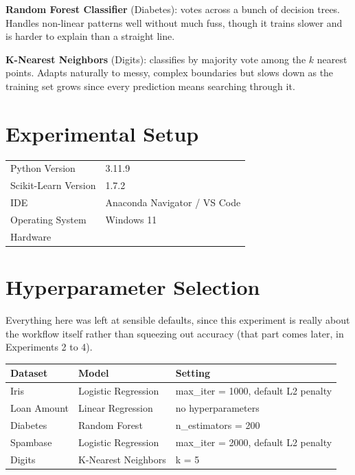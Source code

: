 \documentclass[12pt,a4paper]{article}
\begin{document}
\textbf{Random Forest Classifier} (Diabetes): votes across a bunch of decision trees. Handles
non-linear patterns well without much fuss, though it trains slower and is harder to explain than a
straight line.

\textbf{K-Nearest Neighbors} (Digits): classifies by majority vote among the $k$ nearest points. Adapts
naturally to messy, complex boundaries but slows down as the training set grows since every prediction
means searching through it.

\section{Experimental Setup}
\begin{tabular}{ll}
\toprule
Python Version & 3.11.9 \\
Scikit-Learn Version & 1.7.2 \\
IDE & Anaconda Navigator / VS Code \\
Operating System & Windows 11 \\
Hardware & \\
\bottomrule
\end{tabular}

\section{Hyperparameter Selection}
Everything here was left at sensible defaults, since this experiment is really about the workflow
itself rather than squeezing out accuracy (that part comes later, in Experiments 2 to 4).

\begin{tabular}{p{2.7cm}p{3.4cm}p{7.5cm}}
\toprule
Dataset & Model & Setting \\
\midrule
Iris & Logistic Regression & max\_iter = 1000, default L2 penalty \\
Loan Amount & Linear Regression & no hyperparameters \\
Diabetes & Random Forest & n\_estimators = 200 \\
Spambase & Logistic Regression & max\_iter = 2000, default L2 penalty \\
Digits & K-Nearest Neighbors & k = 5 \\
\bottomrule
\end{tabular}
\end{document}
